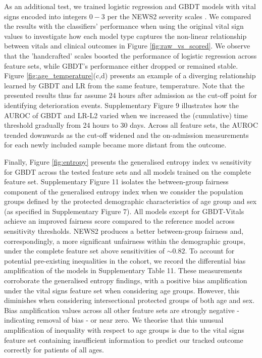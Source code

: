 \documentclass[fleqn,10pt]{wlscirep}
\begin{document}
As an additional test, we trained logistic regression and GBDT models with vital signs encoded into integers $0-3$ per the NEWS2 severity scales \cite{RCP17}. We compared the results with the classifiers' performance when using the original vital sign values to investigate how each model type captures the non-linear relationship between vitals and clinical outcomes in Figure \ref{fig:raw_vs_scored}. We observe that the 'handcrafted' scales boosted the performance of logistic regression across feature sets, while GBDT's performance either dropped or remained stable. Figure \ref{fig:age_temperature}(c,d) presents an example of a diverging relationship learned by GBDT and LR from the same feature, temperature. Note that the presented results thus far assume 24 hours after admission as the cut-off point for identifying deterioration events. Supplementary Figure 9 illustrates how the AUROC of GBDT and LR-L2 varied when we increased the (cumulative) time threshold gradually from 24 hours to 30 days. Across all feature sets, the AUROC trended downwards as the cut-off widened and the on-admission measurements for each newly included sample became more distant from the outcome.

Finally, Figure \ref{fig:entropy} presents the generalised entropy index vs sensitivity for GBDT across the tested feature sets and all models trained on the complete feature set. Supplementary Figure 11 isolates the between-group fairness component of the generalised entropy index when we consider the population groups defined by the protected demographic characteristics of age group and sex (as specified in Supplementary Figure 7). All models except for GBDT-Vitals achieve an improved fairness score compared to the reference model across sensitivity thresholds. NEWS2 produces a better between-group fairness and, correspondingly, a more significant unfairness within the demographic groups, under the complete feature set above sensitivities of $\sim0.82$. To account for potential pre-existing inequalities in the cohort, we record the differential bias amplification of the models in Supplementary Table 11. These measurements corroborate the generalised entropy findings, with a positive bias amplification under the vital signs feature set when considering age groups. However, this diminishes when considering intersectional protected groups of both age and sex. Bias amplification values across all other feature sets are strongly negative - indicating removal of bias - or near zero. We theorise that this unusual amplification of inequality with respect to age groups is due to the vital signs feature set containing insufficient information to predict our tracked outcome correctly for patients of all ages.
\end{document}
